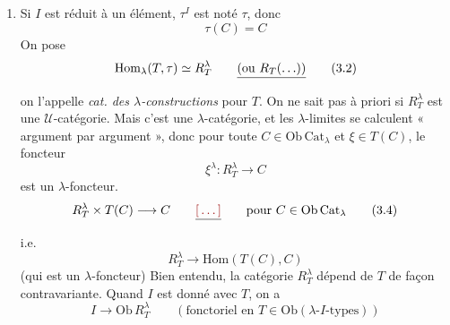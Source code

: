 \documentclass[11pt,a4paper]{article}
\begin{document}
\begin{enumerate}
  \item[{[3]}] Si $I$ est réduit à un élément, $\tau^{I}$ est noté
    $\tau$, donc
    \begin{equation}
      \tau(C) = C
      \tag{3.1}
    \end{equation}
     On pose
    \begin{equation}
      \mathrm{Hom}_{\lambda}(T, \tau) \simeq R^{\lambda}_{T}
      \qquad \struck{(\text{ou } R_{T}(\ldots))}
      \tag{3.2}
    \end{equation}
    on l'appelle \emph{cat. des $\lambda$-constructions} pour $T$. On
    \struck{\ill{}} ne sait pas à priori si $R^{\lambda}_{T}$ est une
    $\mathcal{U}$-catégorie. Mais c'est une \struck{\ill{}}
    $\lambda$-catégorie, et les $\lambda$-limites se calculent
    « argument par argument », donc pour toute $C \in
    \mathrm{Ob}\,\mathrm{Cat}_{\lambda}$ et $\xi \in T(C)$, le foncteur
    \begin{equation}
      \xi^{\lambda} : R^{\lambda}_{T} \longrightarrow C
      \tag{3.3}
    \end{equation}
    \struck{\ill{}} est un $\lambda$-foncteur.
    \begin{equation}
      R^{\lambda}_{T} \times T(C) \longrightarrow C
      \qquad \struck{\ill{}} \qquad
      \text{pour } C \in \mathrm{Ob}\,\mathrm{Cat}_{\lambda}
      \tag{3.4}
    \end{equation}
    i.e.
    \begin{equation}
      R^{\lambda}_{T} \longrightarrow \mathrm{Hom}(T(C), C)
      \tag{3.5}
    \end{equation}
     (qui est un $\lambda$-foncteur)
    Bien entendu, la catégorie $R^{\lambda}_{T}$ dépend de $T$ de
    façon contravariante. Quand $I$ est donné avec $T$,
    on a
    \begin{equation}
      I \longrightarrow \mathrm{Ob}\,R^{\lambda}_{T}
      \qquad (\text{fonctoriel en } T \in \mathrm{Ob}(\lambda\text{-}I\text{-types}))
      \tag{3.5}
    \end{equation}

\end{enumerate}
\end{document}
